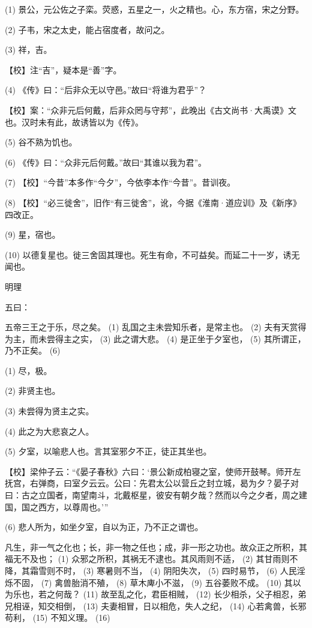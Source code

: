 \documentclass[12pt,UTF8]{ctexbook}
\begin{document}
(1) 景公，元公佐之子栾。荧惑，五星之一，火之精也。心，东方宿，宋之分野。

(2) 子韦，宋之太史，能占宿度者，故问之。

(3) 祥，吉。

【校】注“吉”，疑本是“善”字。

(4) 《传》曰：“后非众无以守邑。”故曰“将谁为君乎”？

【校】案：“众非元后何戴，后非众罔与守邦”，此晚出《古文尚书·大禹谟》文也。汉时未有此，故诱皆以为《传》。

(5) 谷不熟为饥也。

(6) 《传》曰：“众非元后何戴。”故曰“其谁以我为君”。

(7) 【校】“今昔”本多作“今夕”，今依李本作“今昔”。昔训夜。

(8) 【校】“必三徙舍”，旧作“有三徙舍”，讹，今据《淮南·道应训》及《新序》四改正。

(9) 星，宿也。

(10) 以德复星也。徙三舍固其理也。死生有命，不可益矣。而延二十一岁，诱无闻也。





明理


五曰：

五帝三王之于乐，尽之矣。 (1) 乱国之主未尝知乐者，是常主也。 (2) 夫有天赏得为主，而未尝得主之实， (3) 此之谓大悲。 (4) 是正坐于夕室也， (5) 其所谓正，乃不正矣。 (6)

(1) 尽，极。

(2) 非贤主也。

(3) 未尝得为贤主之实。

(4) 此之为大悲哀之人。

(5) 夕室，以喻悲人也。言其室邪夕不正，徒正其坐也。

【校】梁仲子云：“《晏子春秋》六曰：‘景公新成柏寝之室，使师开鼓琴。师开左抚宫，右弹商，曰室夕云云。公曰：先君太公以营丘之封立城，曷为夕？晏子对曰：古之立国者，南望南斗，北戴枢星，彼安有朝夕哉？然而以今之夕者，周之建国，国之西方，以尊周也。’”

(6) 悲人所为，如坐夕室，自以为正，乃不正之谓也。

凡生，非一气之化也；长，非一物之任也；成，非一形之功也。故众正之所积，其福无不及也； (1) 众邪之所积，其祸无不逮也。其风雨则不适， (2) 其甘雨则不降，其霜雪则不时， (3) 寒暑则不当， (4) 阴阳失次， (5) 四时易节， (6) 人民淫烁不固， (7) 禽兽胎消不殖， (8) 草木庳小不滋， (9) 五谷萎败不成。 (10) 其以为乐也，若之何哉？ (11) 故至乱之化，君臣相贼， (12) 长少相杀，父子相忍，弟兄相诬，知交相倒， (13) 夫妻相冒，日以相危，失人之纪， (14) 心若禽兽，长邪苟利， (15) 不知义理。 (16)
\end{document}
